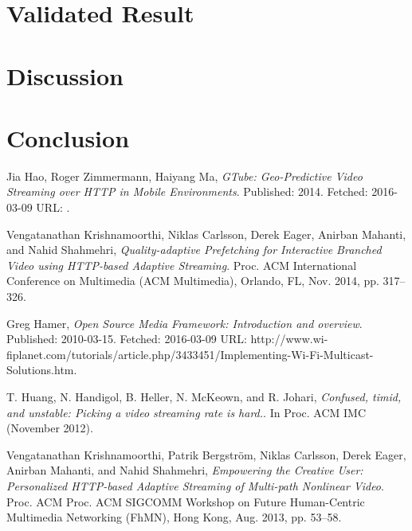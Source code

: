 \documentclass[9pt,a4paper]{acmproc}
\begin{document}
\section{Validated Result}

\section{Discussion}

\section{Conclusion}


\clearpage
\begin{thebibliography}{9}

  Jia Hao, Roger Zimmermann, Haiyang Ma,
  \emph{GTube: Geo-Predictive Video Streaming over HTTP in Mobile Environments}.
  \newline
  Published: 2014. Fetched: 2016-03-09 
  \newline
	URL: .

  Vengatanathan Krishnamoorthi, Niklas Carlsson, Derek Eager, Anirban 
Mahanti, and Nahid Shahmehri,
  \emph{Quality-adaptive Prefetching for Interactive 
Branched Video using HTTP-based Adaptive Streaming}.
  \newline
  Proc. ACM 
International Conference on Multimedia (ACM Multimedia), Orlando, FL, Nov. 2014, pp. 317--326.

  Greg Hamer,
  \emph{Open Source Media Framework: Introduction and overview}.
  \newline
  Published: 2010-03-15. Fetched: 2016-03-09
 \newline
  URL: http://www.wi-fiplanet.com/tutorials/article.php/3433451/Implementing-Wi-Fi-Multicast-Solutions.htm.
  
  T. Huang, N. Handigol, B. Heller, N. McKeown, and R. Johari,
  \emph{Confused, timid, and unstable: Picking a video streaming rate is hard.}.
  \newline
  In Proc. ACM IMC (November 2012).
  
  Vengatanathan Krishnamoorthi, Patrik Bergström, Niklas Carlsson, Derek 
Eager, Anirban Mahanti, and Nahid Shahmehri,
  \emph{Empowering the Creative User: 
Personalized HTTP-based Adaptive Streaming of Multi-path Nonlinear Video}.
  \newline
  Proc. ACM 
Proc. ACM SIGCOMM Workshop on Future Human-Centric Multimedia Networking 
(FhMN), Hong Kong, Aug. 2013, pp. 53--58.


\end{thebibliography}
\end{document}
